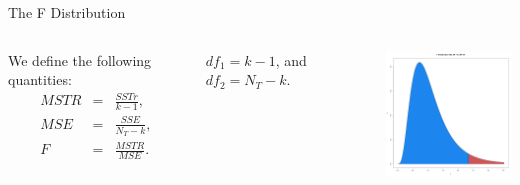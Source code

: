 \begin{frame}{The F Distribution}

  \begin{columns}

    We define the following quantities:
    \begin{eqnarray*}
      MSTR & = & \frac{SSTr}{k-1}, \\    %
      MSE  & = & \frac{SSE}{N_T - k}, \\ %
      F    & = & \frac{MSTR}{MSE}.    \\ %
    \end{eqnarray*}

    $df_1=k-1$, and $df_2=N_T-k$.

  \vfill


    \vfill

    \centerline{\includegraphics[width=4cm]{img/FDistribution}}

    \vfill

    \end{columns}
  
\end{frame}



